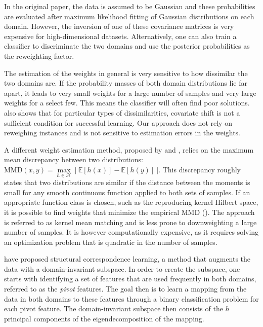 \documentclass[twoside,11pt]{article}
\begin{document}
In the original paper, the data is assumed to be Gaussian and these probabilities are evaluated after maximum likelihood fitting of Gaussian distributions on each domain. However, the inversion of one of these covariance matrices is very expensive for high-dimensional datasets. Alternatively, one can also train a classifier to discriminate the two domains and use the posterior probabilities as the reweighting factor. 

The estimation of the weights in general is very sensitive to how dissimilar the two domains are. If the probability masses of both domain distributions lie far apart, it leads to very small weights for a large number of samples and very large weights for a select few. This means the classifier will often find poor solutions. \cite{ben2010impossibility} also shows that for particular types of dissimilarities, covariate shift is not a sufficient condition for successful learning. Our approach does not rely on reweighing instances and is not sensitive to estimation errors in the weights.

A different weight estimation method, proposed by \cite{huang2007correcting} and \cite{gretton2009covariate}, relies on the maximum mean discrepancy between two distributions: $\text{MMD}(x,y) = \underset{h \in \mathcal{H}}{\max} \ | \ \mathbb{E}[h(x)] - \mathbb{E}[h(y)] \ |$. This discrepancy roughly states that two distributions are similar if the distance between the moments is small for any smooth continuous function applied to both sets of samples. If an appropriate function class is chosen, such as the reproducing kernel Hilbert space, it is possible to find weights that minimize the empirical MMD (\citealp{borgwardt2006integrating}). The approach is referred to as kernel mean matching and is less prone to downweighting a large number of samples. It is however computationally expensive, as it requires solving an optimization problem that is quadratic in the number of samples. 

\cite{blitzer2006domain} have proposed structural correspondence learning, a method that augments the data with a domain-invariant subspace. In order to create the subspace, one starts with identifying a set of features that are used frequently in both domains, referred to as the \emph{pivot} features. The goal then is to learn a mapping from the data in both domains to these features through a binary classification problem for each pivot feature. The domain-invariant subspace then consists of the $h$ principal components of the eigendecomposition of the mapping.
\end{document}
